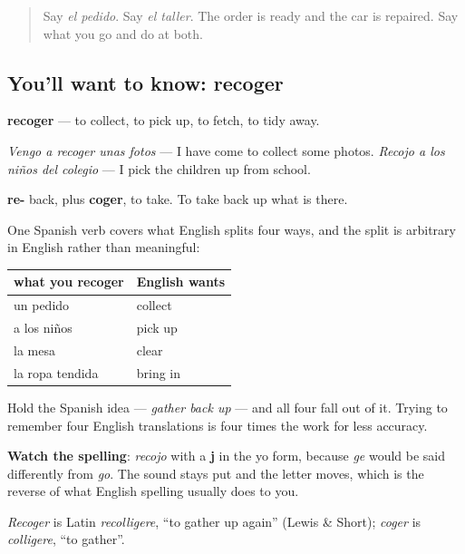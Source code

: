 \label{lesson:ES-C436-recoger}



\begin{quote}
Say \emph{el pedido}. Say \emph{el taller}. The order is ready and the car is repaired. Say what you go and do at both.
\end{quote}

\subsection*{You'll want to know: recoger}
\textbf{recoger} — to collect, to pick up, to fetch, to tidy away.

\emph{Vengo a recoger unas fotos} — I have come to collect some photos. \emph{Recojo a los niños del colegio} — I pick the children up from school.

\begin{cousinweb}
\textbf{re-} back, plus \textbf{coger}, to take. To take back up what is there.

One Spanish verb covers what English splits four ways, and the split is arbitrary in English rather than meaningful:

\noindent
\begin{tabularx}{\linewidth}{@{}>{\raggedright\arraybackslash}X>{\raggedright\arraybackslash}X@{}}
\toprule
\textbf{what you recoger} & \textbf{English wants} \\
\midrule
un pedido & collect \\
a los niños & pick up \\
la mesa & clear \\
la ropa tendida & bring in \\
\bottomrule
\end{tabularx}

Hold the Spanish idea — \emph{gather back up} — and all four fall out of it. Trying to remember four English translations is four times the work for less accuracy.

\textbf{Watch the spelling}: \emph{recojo} with a \textbf{j} in the yo form, because \emph{ge} would be said differently from \emph{go}. The sound stays put and the letter moves, which is the reverse of what English spelling usually does to you.

\emph{Recoger} is Latin \emph{recolligere}, \textquotedblleft{}to gather up again\textquotedblright{} (Lewis \& Short); \emph{coger} is \emph{colligere}, \textquotedblleft{}to gather\textquotedblright{}.
\end{cousinweb}


